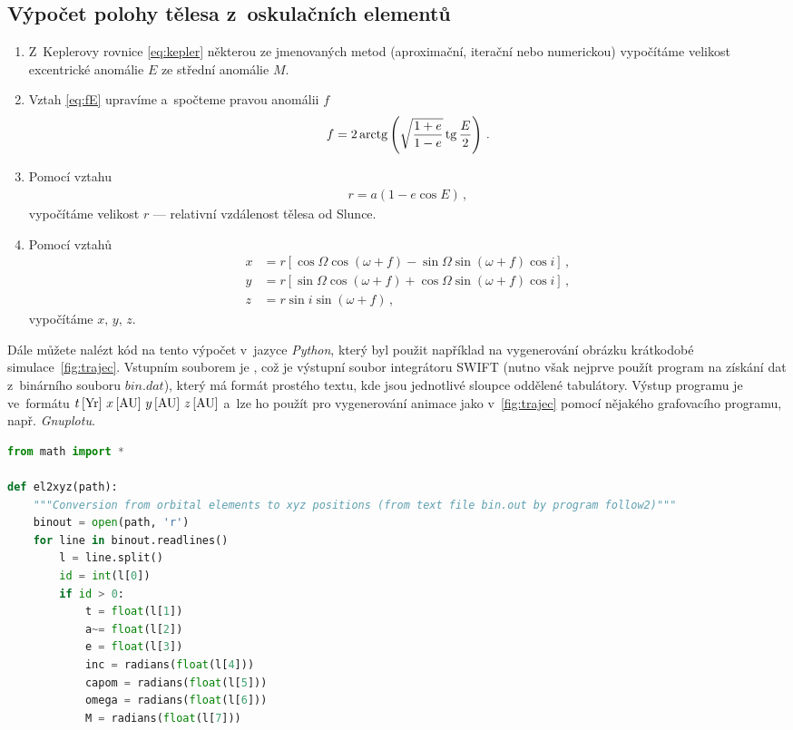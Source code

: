 \documentclass[A4paper, 12pt, oneside, openany]{book}
\begin{document}
\begin{appendices}
	\chapter{Výpočet polohy tělesa z~oskulačních elementů} \label{app:el2xyz}
\vspace{-36pt}
\begin{enumerate}[label=\arabic*.]
	\item Z~Keplerovy rovnice \eqref{eq:kepler} některou ze jmenovaných metod (aproximační, iterační nebo numerickou) vypočítáme velikost excentrické anomálie $E$ ze střední anomálie $M$.
	\item Vztah \eqref{eq:fE} upravíme a~spočteme pravou anomálii $f$
		\begin{align}
			f = 2\operatorname{arctg}\left(\sqrt{\frac{1+e}{1-e}}\operatorname{tg} \frac{E}{2}\right)\,.
		\end{align}
	\item Pomocí vztahu 
\vspace{-12pt}
		\begin{align}
			r=a(1-e\cos E)\,,
		\end{align}
		vypočítáme velikost $r$ --- relativní vzdálenost tělesa od Slunce.
	\item Pomocí vztahů
\vspace{-12pt}
		\begin{align}
			x&=r\left[\cos\Omega\cos(\omega+f)-\sin\Omega\sin(\omega+f)\cos i\right]\,, \\
			y&=r\left[\sin\Omega\cos(\omega+f)+\cos\Omega\sin(\omega+f)\cos i\right]\,, \\
			z&=r\sin i\sin(\omega+f)\,,
		\end{align}
		vypočítáme $x,\,y,\,z$.
\end{enumerate}
	\vspace{-12pt}
	Dále můžete nalézt kód na tento výpočet v~jazyce \textit{Python}, který byl použit například na vygenerování obrázku krátkodobé simulace~\ref{fig:trajec}. Vstupním souborem je , což je výstupní soubor integrátoru SWIFT (nutno však nejprve použít program  na získání dat z~binárního souboru $bin.dat$), který má formát prostého textu, kde jsou jednotlivé sloupce oddělené tabulátory. Výstup programu je ve~formátu $t\,[{\rm Yr}]\ x\,[{\rm AU}]\ y\,[{\rm AU}]\ z\,[{\rm AU}]$ a~lze ho použít pro vygenerování animace jako v~\ref{fig:trajec} pomocí nějakého grafovacího programu, např. \textit{Gnuplotu}.
	\begin{lstlisting}[language=Python]
from math import *

def el2xyz(path):
    """Conversion from orbital elements to xyz positions (from text file bin.out by program follow2)"""
    binout = open(path, 'r')
    for line in binout.readlines()
        l = line.split()
        id = int(l[0])
        if id > 0:
            t = float(l[1])
            a~= float(l[2])
            e = float(l[3])
            inc = radians(float(l[4]))
            capom = radians(float(l[5]))
            omega = radians(float(l[6]))
            M = radians(float(l[7]))
    

\end{lstlisting}
\end{appendices}
\end{document}
